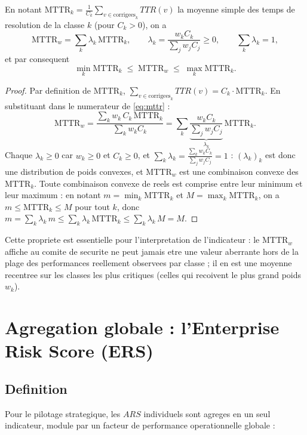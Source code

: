 \begin{propriete}
\label{prop:mttr-weighted-avg}
En notant $\mathrm{MTTR}_k = \frac{1}{C_k}\sum_{v\in\text{corrigees}_k} TTR(v)$ la
moyenne simple des temps de resolution de la classe $k$ (pour $C_k>0$), on a
\[
\mathrm{MTTR}_w = \sum_k \lambda_k\, \mathrm{MTTR}_k,
\qquad
\lambda_k = \frac{w_k C_k}{\sum_j w_j C_j} \ge 0,
\qquad
\sum_k \lambda_k = 1,
\]
et par consequent
\[
\min_k \mathrm{MTTR}_k \;\le\; \mathrm{MTTR}_w \;\le\; \max_k \mathrm{MTTR}_k .
\]
\end{propriete}

\begin{proof}
Par definition de $\mathrm{MTTR}_k$, $\sum_{v\in\text{corrigees}_k}TTR(v) = C_k\cdot
\mathrm{MTTR}_k$. En substituant dans le numerateur de \cref{eq:mttr} :
\[
\mathrm{MTTR}_w = \frac{\sum_k w_k\, C_k\, \mathrm{MTTR}_k}{\sum_k w_k C_k}
= \sum_k \underbrace{\frac{w_k C_k}{\sum_j w_j C_j}}_{\lambda_k}\, \mathrm{MTTR}_k .
\]
Chaque $\lambda_k\ge0$ car $w_k\ge0$ et $C_k\ge0$, et $\sum_k\lambda_k =
\frac{\sum_k w_k C_k}{\sum_j w_j C_j}=1$ : $(\lambda_k)_k$ est donc une distribution
de poids convexes, et $\mathrm{MTTR}_w$ est une combinaison convexe des
$\mathrm{MTTR}_k$. Toute combinaison convexe de reels est comprise entre leur
minimum et leur maximum : en notant $m=\min_k \mathrm{MTTR}_k$ et
$M=\max_k \mathrm{MTTR}_k$, on a $m\le \mathrm{MTTR}_k\le M$ pour tout $k$, donc
$m = \sum_k \lambda_k\, m \le \sum_k \lambda_k\, \mathrm{MTTR}_k \le \sum_k
\lambda_k\, M = M$.
\end{proof}

Cette propriete est essentielle pour l'interpretation de l'indicateur : le
$\mathrm{MTTR}_w$ affiche au comite de securite ne peut jamais etre une valeur
aberrante hors de la plage des performances reellement observees par classe ; il en
est une moyenne recentree sur les classes les plus critiques (celles qui recoivent
le plus grand poids $w_k$).

\section{Agregation globale : l'Enterprise Risk Score (ERS)}

\subsection{Definition}

Pour le pilotage strategique, les $ARS$ individuels sont agreges en un seul
indicateur, module par un facteur de performance operationnelle globale :

